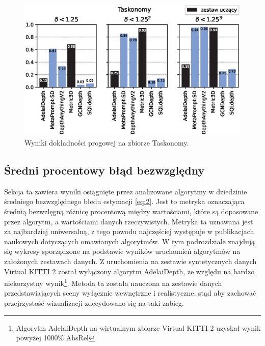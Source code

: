 \begin{figure}[H]
    \centering
    \includegraphics{plots/delta/6}
    \caption{Wyniki dokładności progowej na zbiorze Taskonomy.}
    \label{fig:delta_6}
\end{figure}

\subsection{Średni procentowy błąd bezwzględny}
Sekcja ta zawiera wyniki osiągnięte przez analizowane algorytmy w dziedzinie średniego bezwzględnego błedu estymacji \ref{eq:2}. Jest to metryka oznaczająca średnią bezwzlęgną różnicę procentową między wartościami, które są dopasowane przez algorytm, a wartościami danych rzeczywistych. Metryka ta uznawana jest za najbardziej uniwersalną, z tego powodu najczęściej występuje w publikacjach naukowych dotyczących omawianych algorytmów. W tym podrozdziale znajdują się wykresy sporządzone na podstawie wyników uruchomień algorytmów na założonych zestawach danych. Z uruchomienia na zestawie syntetycznych danych Virtual KITTI 2 został wyłączony algorytm AdelaiDepth, ze względu na bardzo niekorzystny wynik\footnote{Algorytm AdelaiDepth na wirtualnym zbiorze Virtual KITTI 2 uzyskał wynik powyżej 1000\% AbsRel}. Metoda ta została nauczona na zestawie danych przedstawiających sceny wyłącznie wewnętrzne i realistyczne, stąd aby zachować przejrzystość wizualizacji zdecydowano się na taki zabieg.

